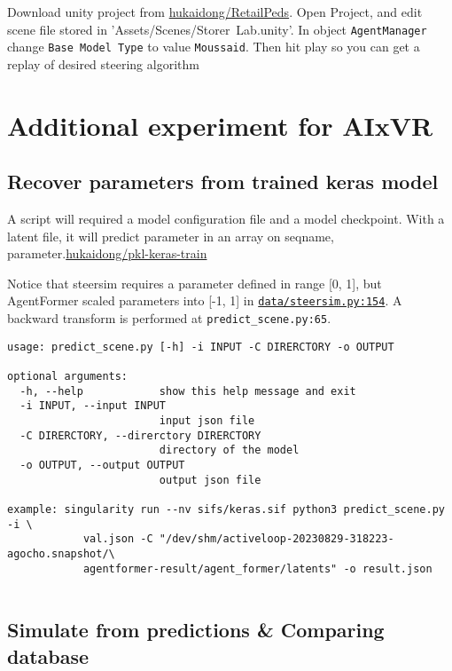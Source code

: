 \documentclass{report}
\begin{document}
Download unity project from \href{ 
https://github.com/hukaidong/RetailPeds/tree/a46f14017152f101e3e420522edc3b41b4406dbc 
}{hukaidong/RetailPeds}. Open Project, and edit scene file stored in 
'Assets/Scenes/Storer~Lab.unity'. In object \texttt{AgentManager} 
change \texttt{Base Model Type} to value 
\texttt{Moussaid}. Then hit play so you can get a replay of desired 
steering algorithm \cite{moussaid2011how}

\chapter{Additional experiment for AIxVR}

\section{Recover parameters from trained keras model}
A script will required a model configuration file and a model checkpoint. With 
a latent file, it will predict parameter in an array on {seqname, 
parameter}.\href{ 
  https://github.com/hukaidong/pkl-keras-train/tree/f97d8b71bf7a55fad0450452a32b71ddcf606fe9
}{hukaidong/pkl-keras-train}

Notice that steersim requires a parameter defined in range [0, 1], but 
AgentFormer scaled parameters into [-1, 1] in \href{ 
https://github.com/hukaidong/MyAgentFormer/blob/e78cd3247d2a2691a5a8ca524b4c7b541fd2f55b/data/steersim.py#L154 
}{\texttt{data/steersim.py:154}}.  A backward transform is performed 
at \texttt{predict_scene.py:65}.

\begin{verbatim}
usage: predict_scene.py [-h] -i INPUT -C DIRERCTORY -o OUTPUT

optional arguments:
  -h, --help            show this help message and exit
  -i INPUT, --input INPUT
                        input json file
  -C DIRERCTORY, --direrctory DIRERCTORY
                        directory of the model
  -o OUTPUT, --output OUTPUT
                        output json file

example: singularity run --nv sifs/keras.sif python3 predict_scene.py -i \
            val.json -C "/dev/shm/activeloop-20230829-318223-agocho.snapshot/\
            agentformer-result/agent_former/latents" -o result.json
  
\end{verbatim}

\section{Simulate from predictions \& Comparing database}
\end{document}
